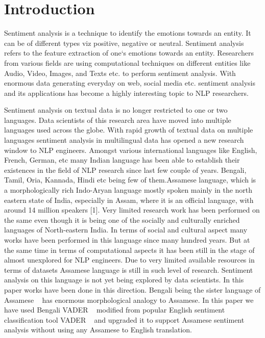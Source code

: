 \documentclass[conference]{IEEEtran}
\begin{document}
\section{Introduction}
Sentiment analysis is a technique to identify the emotions towards an entity. It can be of different types viz positive, negative or neutral. Sentiment analysis refers to the feature extraction of one‘s emotions towards an entity. Researchers from various fields are using computational techniques on different entities like Audio, Video, Images, and Texts etc. to perform sentiment analysis. With enormous data generating everyday on web, social media etc. sentiment analysis and its applications has become a highly interesting topic to NLP researchers.

Sentiment analysis on textual data is no longer restricted to one or two languages. Data scientists of this research area have moved into multiple languages used across the globe. With rapid growth of textual data on multiple languages sentiment analysis in multilingual data has opened a new research window to NLP engineers. Amongst various international languages like English, French, German, etc many Indian language has been able to establish their existences in the field of NLP research since last few couple of years. Bengali, Tamil, Oria, Kannada, Hindi etc being few of them.Assamese language, which is a morphologically rich Indo-Aryan language mostly spoken mainly in the north eastern state of India, especially in Assam, where it is an official language, with around 14 million speakers [1]. Very limited research work has been performed on the same even though it is being one of the socially and culturally enriched languages of North-eastern India. In terms of social and cultural aspect many works have been performed in this language since many hundred years. But at the same time in terms of computational aspects it has been still in the stage of
almost unexplored for NLP engineers. Due to very limited available resources in terms of datasets Assamese language is still in such level of research. Sentiment analysis on this language is not yet being explored by data scientists. In this paper works have been done in this direction. Bengali being the sister language of Assamese ~\cite{b1} has enormous morphological analogy to Assamese. In this paper we have used Bengali VADER ~\cite{b2} modified from popular English sentiment classification tool VADER ~\cite{b3} and upgraded it to support Assamese sentiment analysis without using any Assamese to English translation.
\end{document}
